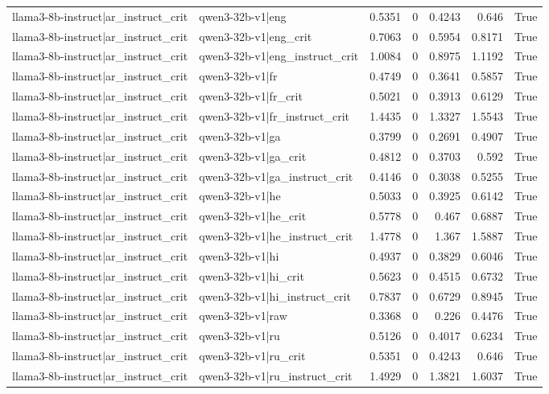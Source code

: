 \begin{table}
\begin{tabular}{l l r r r r l}
llama3-8b-instruct|ar_instruct_crit & qwen3-32b-v1|eng & 0.5351 & 0 & 0.4243 & 0.646 & True \\
llama3-8b-instruct|ar_instruct_crit & qwen3-32b-v1|eng_crit & 0.7063 & 0 & 0.5954 & 0.8171 & True \\
llama3-8b-instruct|ar_instruct_crit & qwen3-32b-v1|eng_instruct_crit & 1.0084 & 0 & 0.8975 & 1.1192 & True \\
llama3-8b-instruct|ar_instruct_crit & qwen3-32b-v1|fr & 0.4749 & 0 & 0.3641 & 0.5857 & True \\
llama3-8b-instruct|ar_instruct_crit & qwen3-32b-v1|fr_crit & 0.5021 & 0 & 0.3913 & 0.6129 & True \\
llama3-8b-instruct|ar_instruct_crit & qwen3-32b-v1|fr_instruct_crit & 1.4435 & 0 & 1.3327 & 1.5543 & True \\
llama3-8b-instruct|ar_instruct_crit & qwen3-32b-v1|ga & 0.3799 & 0 & 0.2691 & 0.4907 & True \\
llama3-8b-instruct|ar_instruct_crit & qwen3-32b-v1|ga_crit & 0.4812 & 0 & 0.3703 & 0.592 & True \\
llama3-8b-instruct|ar_instruct_crit & qwen3-32b-v1|ga_instruct_crit & 0.4146 & 0 & 0.3038 & 0.5255 & True \\
llama3-8b-instruct|ar_instruct_crit & qwen3-32b-v1|he & 0.5033 & 0 & 0.3925 & 0.6142 & True \\
llama3-8b-instruct|ar_instruct_crit & qwen3-32b-v1|he_crit & 0.5778 & 0 & 0.467 & 0.6887 & True \\
llama3-8b-instruct|ar_instruct_crit & qwen3-32b-v1|he_instruct_crit & 1.4778 & 0 & 1.367 & 1.5887 & True \\
llama3-8b-instruct|ar_instruct_crit & qwen3-32b-v1|hi & 0.4937 & 0 & 0.3829 & 0.6046 & True \\
llama3-8b-instruct|ar_instruct_crit & qwen3-32b-v1|hi_crit & 0.5623 & 0 & 0.4515 & 0.6732 & True \\
llama3-8b-instruct|ar_instruct_crit & qwen3-32b-v1|hi_instruct_crit & 0.7837 & 0 & 0.6729 & 0.8945 & True \\
llama3-8b-instruct|ar_instruct_crit & qwen3-32b-v1|raw & 0.3368 & 0 & 0.226 & 0.4476 & True \\
llama3-8b-instruct|ar_instruct_crit & qwen3-32b-v1|ru & 0.5126 & 0 & 0.4017 & 0.6234 & True \\
llama3-8b-instruct|ar_instruct_crit & qwen3-32b-v1|ru_crit & 0.5351 & 0 & 0.4243 & 0.646 & True \\
llama3-8b-instruct|ar_instruct_crit & qwen3-32b-v1|ru_instruct_crit & 1.4929 & 0 & 1.3821 & 1.6037 & True \\

\end{tabular}
\end{table}
